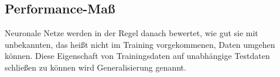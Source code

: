 







\subsection{Performance-Maß}

Neuronale Netze werden in der Regel danach bewertet, wie gut sie mit unbekannten, das heißt nicht im Training vorgekommenen, Daten umgehen können.
Diese Eigenschaft von Trainingsdaten auf unabhängige Testdaten schließen zu können wird Generalisierung genannt. 

